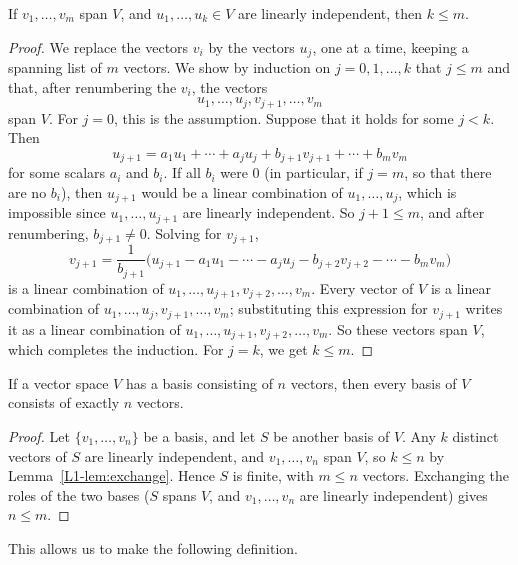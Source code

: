 \begin{lemma}\label{L1-lem:exchange}
    If $v_1, \ldots, v_m$ span $V$, and $u_1, \ldots, u_k \in V$ are linearly independent, then $k \leq m$.
\end{lemma}

\begin{proof}
    We replace the vectors $v_i$ by the vectors $u_j$, one at a time, keeping a spanning list of $m$ vectors. We show by induction on $j = 0, 1, \ldots, k$ that $j \leq m$ and that, after renumbering the $v_i$, the vectors
    \[u_1, \ldots, u_j, v_{j+1}, \ldots, v_m\]
    span $V$. For $j = 0$, this is the assumption. Suppose that it holds for some $j < k$. Then
    \[u_{j+1} = a_1 u_1 + \cdots + a_j u_j + b_{j+1} v_{j+1} + \cdots + b_m v_m\]
    for some scalars $a_i$ and $b_i$. If all $b_i$ were $0$ (in particular, if $j = m$, so that there are no $b_i$), then $u_{j+1}$ would be a linear combination of $u_1, \ldots, u_j$, which is impossible since $u_1, \ldots, u_{j+1}$ are linearly independent. So $j + 1 \leq m$, and after renumbering, $b_{j+1} \neq 0$. Solving for $v_{j+1}$,
    \[v_{j+1} = \frac{1}{b_{j+1}}\Big(u_{j+1} - a_1 u_1 - \cdots - a_j u_j - b_{j+2} v_{j+2} - \cdots - b_m v_m\Big)\]
    is a linear combination of $u_1, \ldots, u_{j+1}, v_{j+2}, \ldots, v_m$. Every vector of $V$ is a linear combination of $u_1, \ldots, u_j, v_{j+1}, \ldots, v_m$; substituting this expression for $v_{j+1}$ writes it as a linear combination of $u_1, \ldots, u_{j+1}, v_{j+2}, \ldots, v_m$. So these vectors span $V$, which completes the induction. For $j = k$, we get $k \leq m$.
\end{proof}

\begin{theorem}\label{L1-thm:basis-size}
    If a vector space $V$ has a basis consisting of $n$ vectors, then every basis of $V$ consists of exactly $n$ vectors.
\end{theorem}

\begin{proof}
    Let $\{v_1, \ldots, v_n\}$ be a basis, and let $S$ be another basis of $V$. Any $k$ distinct vectors of $S$ are linearly independent, and $v_1, \ldots, v_n$ span $V$, so $k \leq n$ by Lemma~\ref{L1-lem:exchange}. Hence $S$ is finite, with $m \leq n$ vectors. Exchanging the roles of the two bases ($S$ spans $V$, and $v_1, \ldots, v_n$ are linearly independent) gives $n \leq m$.
\end{proof}

This allows us to make the following definition.

